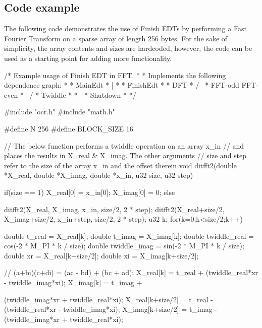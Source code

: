 \subsection{Code example}

The following code demonstrates the use of Finish EDTs by performing a Fast Fourier
Transform on a sparse array of length 256 bytes. For the sake of simplicity, the
array contents and sizes are hardcoded, however, the code can be used as a starting
point for adding more functionality.

\begin{ocrsnip}
/* Example usage of Finish EDT in FFT.
 *
 * Implements the following dependence graph:
 *
 * MainEdt
 *    |
 *
 * FinishEdt
 * {
 *       DFT
 *      /   \
 * FFT-odd FFT-even
 *      \   /
 *     Twiddle
 * }
 *    |
 * Shutdown
 *
 */

#include "ocr.h"
#include "math.h"

#define N          256
#define BLOCK_SIZE 16

// The below function performs a twiddle operation on an array x_in
// and places the results in X_real & X_imag. The other arguments
// size and step refer to the size of the array x_in and the offset therein
void ditfft2(double *X_real, double *X_imag, double *x_in, u32 size, u32 step) {
    if(size == 1) {
        X_real[0] = x_in[0];
        X_imag[0] = 0;
    } else {
        ditfft2(X_real, X_imag, x_in, size/2, 2 * step);
        ditfft2(X_real+size/2, X_imag+size/2, x_in+step, size/2, 2 * step);
        u32 k;
        for(k=0;k<size/2;k++) {
            double t_real = X_real[k];
            double t_imag = X_imag[k];
            double twiddle_real = cos(-2 * M_PI * k / size);
            double twiddle_imag = sin(-2 * M_PI * k / size);
            double xr = X_real[k+size/2];
            double xi = X_imag[k+size/2];

            // (a+bi)(c+di) = (ac - bd) + (bc + ad)i
            X_real[k] = t_real +
                (twiddle_real*xr - twiddle_imag*xi);
            X_imag[k] = t_imag +

                (twiddle_imag*xr + twiddle_real*xi);
            X_real[k+size/2] = t_real -
                (twiddle_real*xr - twiddle_imag*xi);
            X_imag[k+size/2] = t_imag -
                (twiddle_imag*xr + twiddle_real*xi);
        }
    }
}


\end{ocrsnip}
